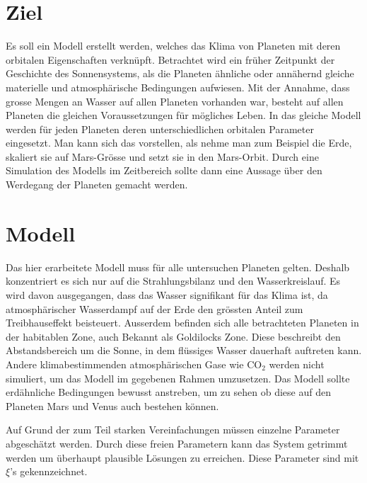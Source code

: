 \begin{refsection}
\section{Ziel}
Es soll ein Modell erstellt werden, welches das Klima von Planeten mit deren orbitalen Eigenschaften verknüpft.
Betrachtet wird ein früher Zeitpunkt der Geschichte des Sonnensystems, als die Planeten ähnliche oder annähernd gleiche materielle und atmosphärische Bedingungen aufwiesen.
Mit der Annahme, dass grosse Mengen an Wasser auf allen Planeten vorhanden war, besteht auf allen Planeten die gleichen Voraussetzungen für mögliches Leben.
In das gleiche Modell werden für jeden Planeten deren unterschiedlichen orbitalen Parameter eingesetzt. Man kann sich das vorstellen, als nehme man zum Beispiel die Erde, skaliert sie auf Mars-Grösse und setzt sie in den Mars-Orbit. 
Durch eine Simulation des Modells im Zeitbereich sollte dann eine Aussage über den Werdegang der Planeten gemacht werden.

\section{Modell}


	

	
	
	
	Das hier erarbeitete Modell muss für alle untersuchen Planeten gelten. Deshalb konzentriert es sich nur auf die Strahlungsbilanz und den Wasserkreislauf. Es wird davon ausgegangen, dass das Wasser signifikant für das Klima ist, da atmosphärischer Wasserdampf auf der Erde den grössten Anteil zum Treibhauseffekt beisteuert. Ausserdem befinden sich alle betrachteten Planeten in der habitablen Zone, auch Bekannt als Goldilocks Zone. Diese beschreibt den Abstandsbereich um die Sonne, in dem flüssiges Wasser dauerhaft auftreten kann.
	Andere klimabestimmenden atmosphärischen Gase wie $\text{CO}_\text{2}$ werden nicht simuliert, um das Modell im gegebenen Rahmen umzusetzen.
	Das Modell sollte erdähnliche Bedingungen bewusst anstreben, um zu sehen ob diese auf den Planeten Mars und Venus auch bestehen können.
	
Auf Grund der zum Teil starken Vereinfachungen müssen einzelne Parameter abgeschätzt werden. Durch diese freien Parametern kann das System getrimmt werden um überhaupt plausible Lösungen zu erreichen. Diese Parameter sind mit $\xi$'s gekennzeichnet.


\end{refsection}

